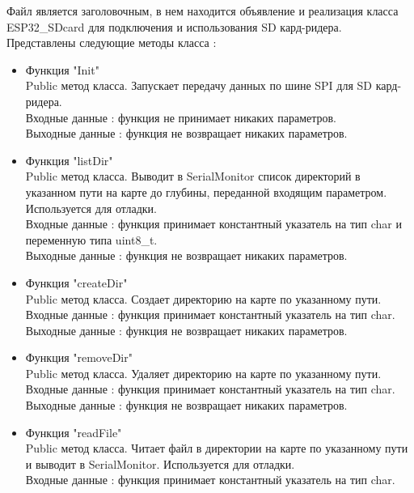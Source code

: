 \documentclass[a4document]{article}
\begin{document}
{\begin{itemize}
        Файл является заголовочным, в нем находится объявление и реализация класса ESP32\_SDcard
        для подключения и использования SD кард-ридера.
        Представлены следующие методы класса : 
        \begin{itemize}
            \item Функция "Init" \\ 
                Public метод класса. Запускает передачу данных по шине SPI для SD кард-ридера. \\
                Входные данные : функция не принимает никаких параметров. \\
                Выходные данные : функция не возвращает никаких параметров.
            \item Функция "listDir" \\ 
                Public метод класса. Выводит в SerialMonitor список директорий в указанном пути на карте до глубины, 
                переданной входящим параметром. Используется для отладки.\\
                Входные данные : функция принимает константный указатель на тип char и переменную типа uint8\_t. \\
                Выходные данные : функция не возвращает никаких параметров.
            \item Функция "createDir" \\ 
                Public метод класса. Создает директорию на карте по указанному пути. \\ 
                Входные данные : функция принимает константный указатель на тип char. \\
                Выходные данные : функция не возвращает никаких параметров.
            \item Функция "removeDir" \\ 
                Public метод класса. Удаляет директорию на карте по указанному пути. \\ 
                Входные данные : функция принимает константный указатель на тип char. \\
                Выходные данные : функция не возвращает никаких параметров.
            \item Функция "readFile" \\
                Public метод класса. Читает файл в директории на карте по указанному пути и 
                выводит в SerialMonitor. Используется для отладки. \\ 
                Входные данные : функция принимает константный указатель на тип char. \\

\end{itemize}
\end{itemize}}
\end{document}
